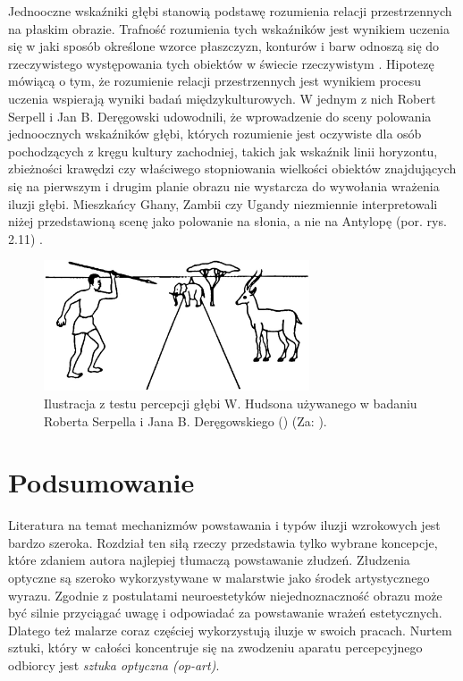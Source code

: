 \documentclass[licencjacka]{kdypl}
\begin{document}
Jednooczne wskaźniki głębi stanowią podstawę rozumienia relacji przestrzennych na płaskim obrazie. Trafność rozumienia tych wskaźników jest wynikiem uczenia się w jaki sposób określone wzorce płaszczyzn, konturów i barw odnoszą się do rzeczywistego występowania tych obiektów w świecie rzeczywistym \citep[s. 223]{Francuz}. Hipotezę mówiącą o tym, że rozumienie relacji przestrzennych jest wynikiem procesu uczenia wspierają wyniki badań międzykulturowych. W jednym z nich Robert Serpell i Jan B. Deręgowski udowodnili, że wprowadzenie do sceny polowania jednoocznych wskaźników głębi, których rozumienie jest oczywiste dla osób pochodzących z kręgu kultury zachodniej, takich jak  wskaźnik linii horyzontu,  zbieżności krawędzi czy właściwego stopniowania wielkości obiektów znajdujących się na pierwszym i drugim planie obrazu nie wystarcza do wywołania wrażenia iluzji głębi. Mieszkańcy Ghany, Zambii czy Ugandy niezmiennie interpretowali niżej przedstawioną scenę jako polowanie na słonia, a nie na Antylopę (por. rys. 2.11) \citep{Serpell}.

\begin{figure}[H]
\includegraphics[width=0.7\textwidth]{Hudson.jpg}
\centering
\caption{Ilustracja z testu percepcji głębi W. Hudsona używanego w badaniu Roberta Serpella i  Jana B. Deręgowskiego (\citeyear{Serpell})  (Za: \citealt{Hudson}).}
\end{figure}


\section{Podsumowanie}

Literatura na temat mechanizmów powstawania i typów iluzji wzrokowych jest bardzo szeroka. Rozdział ten siłą rzeczy przedstawia tylko wybrane koncepcje, które zdaniem autora najlepiej tłumaczą powstawanie złudzeń. Złudzenia optyczne są szeroko wykorzystywane w malarstwie jako środek artystycznego wyrazu. Zgodnie z postulatami neuroestetyków niejednoznaczność obrazu może być silnie przyciągać uwagę i odpowiadać za powstawanie wrażeń estetycznych. Dlatego też malarze coraz częściej wykorzystują iluzje w swoich pracach. Nurtem sztuki, który w całości koncentruje się na zwodzeniu aparatu percepcyjnego odbiorcy jest \textit{sztuka optyczna (op-art)}.
\end{document}
